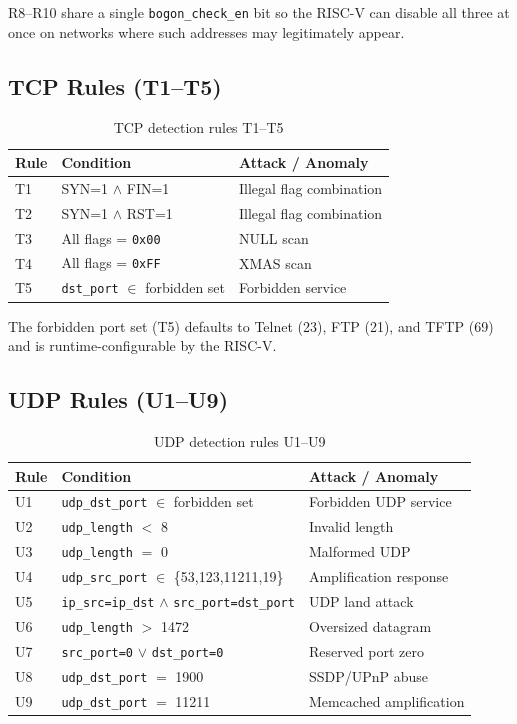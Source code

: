 R8--R10 share a single \texttt{bogon\_check\_en} bit so the RISC-V can disable all three at once on networks where such addresses may legitimately appear.

\subsection{TCP Rules (T1--T5)}

\begin{table}[H]
	\centering
	\caption{TCP detection rules T1--T5}
	\begin{tabular}{lll}
		\toprule
		\textbf{Rule} & \textbf{Condition} & \textbf{Attack / Anomaly} \\
		\midrule
		T1 & SYN=1 $\wedge$ FIN=1          & Illegal flag combination    \\
		T2 & SYN=1 $\wedge$ RST=1          & Illegal flag combination    \\
		T3 & All flags = \texttt{0x00}     & NULL scan                   \\
		T4 & All flags = \texttt{0xFF}     & XMAS scan                   \\
		T5 & \texttt{dst\_port} $\in$ forbidden set & Forbidden service  \\
		\bottomrule
	\end{tabular}
	\label{tab:t1t5}
\end{table}

The forbidden port set (T5) defaults to Telnet (23), FTP (21), and TFTP (69) and is runtime-configurable by the RISC-V.

\subsection{UDP Rules (U1--U9)}

\begin{table}[H]
	\centering
	\caption{UDP detection rules U1--U9}
	\begin{tabular}{lp{5.5cm}p{5cm}}
		\toprule
		\textbf{Rule} & \textbf{Condition} & \textbf{Attack / Anomaly} \\
		\midrule
		U1 & \texttt{udp\_dst\_port} $\in$ forbidden set & Forbidden UDP service \\
		U2 & \texttt{udp\_length} $<$ 8 & Invalid length \\
		U3 & \texttt{udp\_length} $=$ 0 & Malformed UDP \\
		U4 & \texttt{udp\_src\_port} $\in$ \{53,123,11211,19\} & Amplification response \\
		U5 & \texttt{ip\_src=ip\_dst} $\wedge$ \texttt{src\_port=dst\_port} & UDP land attack \\
		U6 & \texttt{udp\_length} $>$ 1472 & Oversized datagram \\
		U7 & \texttt{src\_port=0} $\vee$ \texttt{dst\_port=0} & Reserved port zero \\
		U8 & \texttt{udp\_dst\_port} $=$ 1900 & SSDP/UPnP abuse \\
		U9 & \texttt{udp\_dst\_port} $=$ 11211 & Memcached amplification \\
		\bottomrule
	\end{tabular}
	\label{tab:u1u9}
\end{table}

